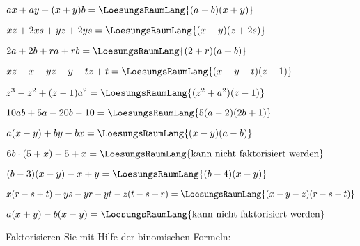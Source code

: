 \begin{bbwAufgabenBlock}
\item $ax+ay-(x+y)b = \LoesungsRaumLang{(a-b)(x+y)}$
\item $xz+2xs+yz+2ys = \LoesungsRaumLang{(x+y)(z+2s)}$
\item $2a+2b + ra+rb = \LoesungsRaumLang{(2+r)(a+b)}$
\item $xz-x+yz-y-tz+t = \LoesungsRaumLang{(x+y-t)(z-1)}$\noTRAINER{\newpage}
\item $z^3-z^2 + (z-1)a^2 = \LoesungsRaumLang{(z^2+a^2)(z-1)}$
\item $10ab+5a - 20b -10 = \LoesungsRaumLang{5(a-2)(2b+1)}$
\item $a(x-y) + by-bx = \LoesungsRaumLang{(x-y)(a-b)}$
\item $6b\cdot{}(5+x) - 5+x = \LoesungsRaumLang{\text{kann nicht faktorisiert werden}}$
\item $(b-3)(x-y)-x+y = \LoesungsRaumLang{(b-4)(x-y)}$\noTRAINER{\newpage}
\item $x(r-s+t)+ ys-yr-yt - z(t-s+r) =\LoesungsRaumLang{(x-y-z)(r-s+t)}$

\item $a(x+y) - b(x-y) = \LoesungsRaumLang{\textrm{kann nicht faktorisiert werden}}$

\end{bbwAufgabenBlock}


\newpage





Faktorisieren Sie mit Hilfe der binomischen Formeln:



